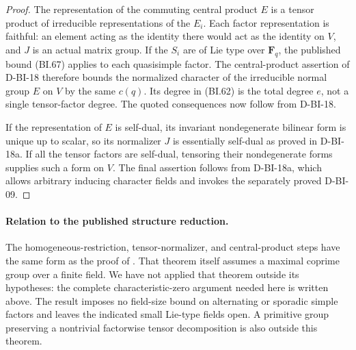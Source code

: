 \begin{proof}
The representation of the commuting central product $E$ is a
tensor product of irreducible representations of the $E_i$.
Each factor representation is faithful: an element acting as the
identity there would act as the identity on $V$, and $J$ is an
actual matrix group.  If the $S_i$ are of Lie type over
$\mathbf F_q$, the published bound (BI.67) applies to each
quasisimple factor.  The central-product assertion of D-BI-18
therefore bounds the normalized character of the irreducible
normal group $E$ on $V$ by the same $c(q)$.  Its degree in
(BI.62) is the total degree $e$, not a single tensor-factor
degree.  The quoted consequences now follow from D-BI-18.

If the representation of $E$ is self-dual, its invariant
nondegenerate bilinear form is unique up to scalar, so its
normalizer $J$ is essentially self-dual as proved in D-BI-18a.
If all the tensor factors are self-dual, tensoring their
nondegenerate forms supplies such a form on $V$.  The final
assertion follows from D-BI-18a, which allows arbitrary inducing
character fields and invokes the separately proved D-BI-09.
\end{proof}

\paragraph{Relation to the published structure reduction.}
The homogeneous-restriction, tensor-normalizer, and central-product
steps have the same form as the proof of
\cite[Theorem~5.1, pp.~148--151]{BI:DHP}.  That theorem itself
assumes a maximal coprime group over a finite field.  We have not
applied that theorem outside its hypotheses: the complete
characteristic-zero argument needed here is written above.
The result imposes no field-size bound on alternating or sporadic
simple factors and leaves the indicated small Lie-type fields
open.  A primitive group preserving a nontrivial factorwise
tensor decomposition is also outside this theorem.
